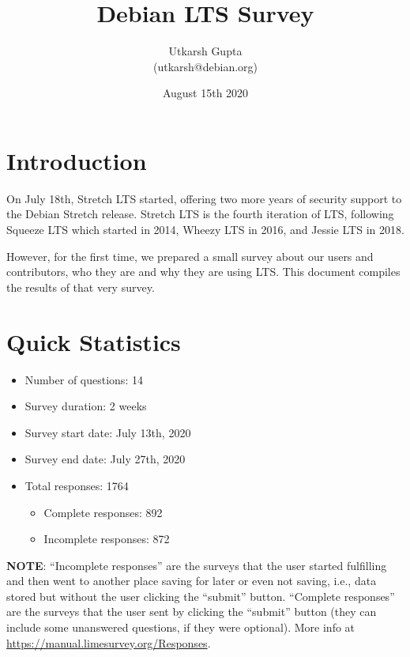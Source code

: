 \documentclass{article}
\title{\textbf{Debian LTS Survey}}
\author{Utkarsh Gupta \\
    \small (utkarsh@debian.org)}
\date{August 15th 2020}
\begin{document}
\maketitle

\vspace{5mm}
\section{Introduction}

On July 18th, Stretch LTS started, offering two more years of security support to the Debian Stretch
release. Stretch LTS is the fourth iteration of LTS, following Squeeze LTS which started in 2014,
Wheezy LTS in 2016, and Jessie LTS in 2018. \par

\vspace{3mm}
However, for the first time, we prepared a small survey about our users and contributors, who they
are and why they are using LTS. This document compiles the results of that very survey.

\vspace{5mm}
\section{Quick Statistics}

\vspace{3mm}
\begin{itemize}
    \item Number of questions: 14
    \item Survey duration: 2 weeks
    \item Survey start date: July 13th, 2020
    \item Survey end date: July 27th, 2020
    \item Total responses: 1764
    \begin{itemize}
        \item Complete responses: 892
        \item Incomplete responses: 872
    \end{itemize}
\end{itemize}
\textbf{NOTE}: ``Incomplete responses'' are the surveys that the user started fulfilling and then went
to another place saving for later or even not saving, i.e., data stored but without the user clicking
the ``submit'' button. ``Complete responses'' are the surveys that the user sent by clicking
the ``submit'' button (they can include some unanswered questions, if they were optional).
More info at \href{https://manual.limesurvey.org/Responses}{https://manual.limesurvey.org/Responses}.
\end{document}
